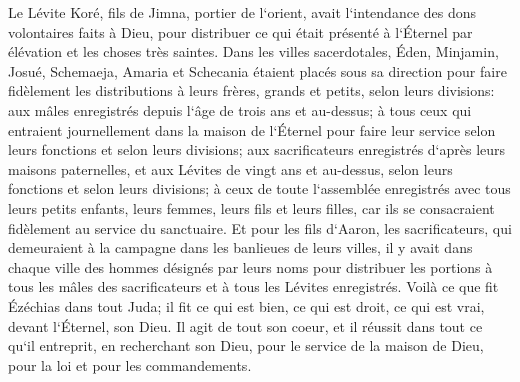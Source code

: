 \verse Le Lévite Koré, fils de Jimna, portier de l`orient, avait l`intendance des dons volontaires faits à Dieu, pour distribuer ce qui était présenté à l`Éternel par élévation et les choses très saintes. 
\verse Dans les villes sacerdotales, Éden, Minjamin, Josué, Schemaeja, Amaria et Schecania étaient placés sous sa direction pour faire fidèlement les distributions à leurs frères, grands et petits, selon leurs divisions: 
\verse aux mâles enregistrés depuis l`âge de trois ans et au-dessus; à tous ceux qui entraient journellement dans la maison de l`Éternel pour faire leur service selon leurs fonctions et selon leurs divisions; 
\verse aux sacrificateurs enregistrés d`après leurs maisons paternelles, et aux Lévites de vingt ans et au-dessus, selon leurs fonctions et selon leurs divisions; 
\verse à ceux de toute l`assemblée enregistrés avec tous leurs petits enfants, leurs femmes, leurs fils et leurs filles, car ils se consacraient fidèlement au service du sanctuaire. 
\verse Et pour les fils d`Aaron, les sacrificateurs, qui demeuraient à la campagne dans les banlieues de leurs villes, il y avait dans chaque ville des hommes désignés par leurs noms pour distribuer les portions à tous les mâles des sacrificateurs et à tous les Lévites enregistrés. 
\verse Voilà ce que fit Ézéchias dans tout Juda; il fit ce qui est bien, ce qui est droit, ce qui est vrai, devant l`Éternel, son Dieu. 
\verse Il agit de tout son coeur, et il réussit dans tout ce qu`il entreprit, en recherchant son Dieu, pour le service de la maison de Dieu, pour la loi et pour les commandements. 

\chapter{}

